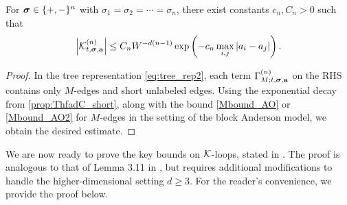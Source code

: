 \begin{lemma}\label{lem_pureloop} 
For ${\boldsymbol{\sigma}} \in \{+, -\}^n$ with $\sigma_1 = \sigma_2 = \cdots = \sigma_n$, there exist constants $c_n,C_n>0$ such that 
\begin{equation}\label{res_pureKes}
\left|\mathcal{K}^{(n)}_{t, {\boldsymbol{\sigma}}, \mathbf{a}}\right|\le C_n W^{-d(n-1)} \exp\left(-c_n\max_{i,j}|a_i-a_j|\right).
\end{equation} 
\end{lemma}
\begin{proof}
In the tree representation \eqref{eq:tree_rep2}, each term $\Gamma^{(n)}_{M;t,{\boldsymbol{\sigma}},{\mathbf{a}}}$ on the RHS contains only $M$-edges and short unlabeled edges. Using the exponential decay from \eqref{prop:ThfadC_short}, along with the bound \eqref{Mbound_AO} or \eqref{Mbound_AO2} for $M$-edges in the setting of the block Anderson model, we obtain the desired estimate. 
\end{proof}

We are now ready to prove the key bounds on $\mathcal K$-loops, stated in . The proof is analogous to that of Lemma 3.11 in \cite{YY_25}, but requires additional modifications to handle the higher-dimensional setting $d \ge 3$. For the reader's convenience, we provide the proof below.




